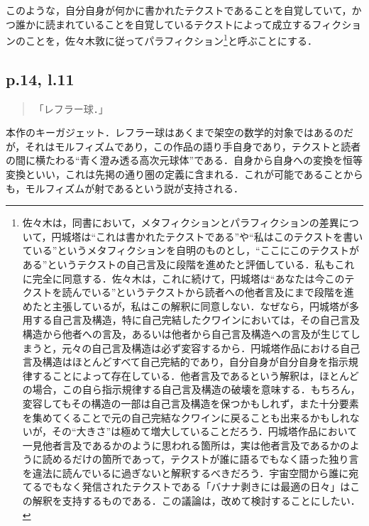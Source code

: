 \documentclass[10pt, a5paper, twoside]{jsarticle}
\theoremstyle{definition}
\begin{document}
                このような，自分自身が何かに書かれたテクストであることを自覚していて，かつ誰かに読まれていることを自覚しているテクストによって成立するフィクションのことを，佐々木敦\cite{ssk}に従ってパラフィクション\footnote{佐々木は，同書において，メタフィクションとパラフィクションの差異について，円城塔は“これは書かれたテクストである”や“私はこのテクストを書いている”というメタフィクションを自明のものとし，“ここにこのテクストがある”というテクストの自己言及に段階を進めたと評価している．私もこれに完全に同意する．佐々木は，これに続けて，円城塔は“あなたは今このテクストを読んでいる”というテクストから読者への他者言及にまで段階を進めたと主張しているが，私はこの解釈に同意しない．なぜなら，円城塔が多用する自己言及構造，特に自己完結したクワインにおいては，その自己言及構造から他者への言及，あるいは他者から自己言及構造への言及が生じてしまうと，元々の自己言及構造は必ず変容するから．円城塔作品における自己言及構造はほとんどすべて自己完結的であり，自分自身が自分自身を指示規律することによって存在している．他者言及であるという解釈は，ほとんどの場合，この自ら指示規律する自己言及構造の破壊を意味する．もちろん，変容してもその構造の一部は自己言及構造を保つかもしれず，また十分要素を集めてくることで元の自己完結なクワインに戻ることも出来るかもしれないが，その“大きさ”は極めて増大していることだろう．円城塔作品において一見他者言及であるかのように思われる箇所は，実は他者言及であるかのように読めるだけの箇所であって，テクストが誰に語るでもなく語った独り言を違法に読んでいるに過ぎないと解釈するべきだろう．宇宙空間から誰に宛てるでもなく発信されたテクストである「バナナ剥きには最適の日々」はこの解釈を支持するものである．この議論は，改めて検討することにしたい．}と呼ぶことにする．

            \subsection{p.14, l.11}

                \begin{quote}

                    「レフラー球．」

                \end{quote}

                本作のキーガジェット．レフラー球はあくまで架空の数学的対象ではあるのだが，それはモルフィズムであり，この作品の語り手自身であり，テクストと読者の間に横たわる“青く澄み透る高次元球体”である．自身から自身への変換を恒等変換といい，これは先掲の通り圏の定義に含まれる．これが可能であることからも，モルフィズムが射であるという説が支持される．
\end{document}
